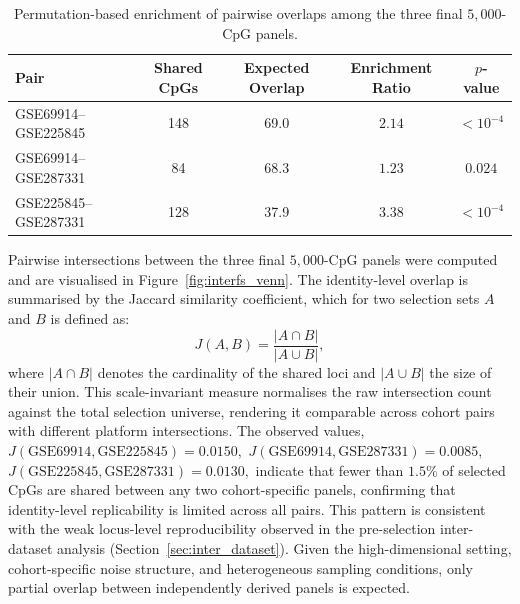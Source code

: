 \begin{table}[t]
\centering
\scriptsize
\caption{Permutation-based enrichment of pairwise overlaps among the three final $5{,}000$-CpG panels.}
\label{tab:interfs_overlap}
\begin{tabular}{l c c c c}
\toprule
Pair & Shared CpGs & Expected Overlap & Enrichment Ratio & $p$-value \\
\midrule
GSE69914--GSE225845 & 148 & 69.0 & $2.14$ & $< 10^{-4}$ \\
GSE69914--GSE287331 &  84 & 68.3 & $1.23$ & $0.024$     \\
GSE225845--GSE287331 & 128 & 37.9 & $3.38$ & $< 10^{-4}$ \\
\bottomrule
\end{tabular}
\end{table}
Pairwise intersections between the three final $5{,}000$-CpG panels were
computed and are visualised in Figure~\ref{fig:interfs_venn}.
The identity-level overlap is summarised by the Jaccard similarity
coefficient, which for two selection sets $A$ and $B$ is defined as:
\begin{equation}
    J(A,B) = \frac{|A \cap B|}{|A \cup B|},
    \label{eq:jaccard}
\end{equation}
where $|A \cap B|$ denotes the cardinality of the shared loci and
$|A \cup B|$ the size of their union.
This scale-invariant measure normalises the raw intersection count
against the total selection universe, rendering it comparable across
cohort pairs with different platform intersections.
The observed values,
\(
J(\text{GSE69914},\text{GSE225845}) = 0.0150,\)
\(J(\text{GSE69914},\text{GSE287331}) = 0.0085,\)
\(J(\text{GSE225845},\text{GSE287331}) = 0.0130,
\)
indicate that fewer than $1.5\%$ of selected CpGs are shared between
any two cohort-specific panels, confirming that identity-level
replicability is limited across all pairs.
This pattern is consistent with the weak locus-level reproducibility
observed in the pre-selection inter-dataset analysis
(Section~\ref{sec:inter_dataset}).
Given the high-dimensional setting, cohort-specific noise structure,
and heterogeneous sampling conditions, only partial overlap
between independently derived panels is expected.

